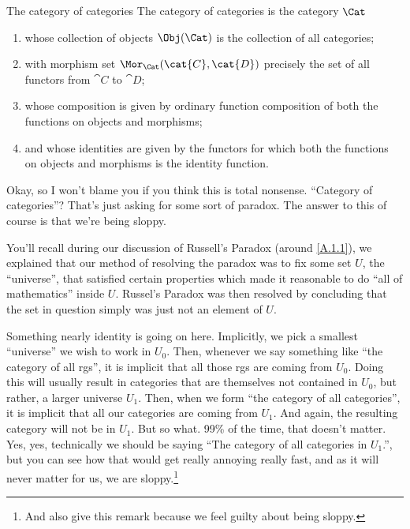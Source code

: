 \begin{exm}{The category of categories}{}
	The category of categories is the category $\Cat$
	\begin{enumerate}
		\item whose collection of objects $\Obj (\Cat )$ is the collection of all categories;
		\item with morphism set $\Mor _{\Cat}(\cat{C},\cat{D})$ precisely the set of all functors from $\cat{C}$ to $\cat{D}$;
		\item whose composition is given by ordinary function composition of both the functions on objects and morphisms;
		\item and whose identities are given by the functors for which both the functions on objects and morphisms is the identity function.
	\end{enumerate}
	\begin{rmk}
		Okay, so I won't blame you if you think this is total nonsense.  ``Category of categories''?  That's just asking for some sort of paradox.  The answer to this of course is that we're being sloppy.
		
		You'll recall during our discussion of Russell's Paradox (around \eqref{A.1.1}), we explained that our method of resolving the paradox was to fix some set $U$, the ``universe'', that satisfied certain properties which made it reasonable to do ``all of mathematics'' inside $U$.  Russel's Paradox was then resolved by concluding that the set in question simply was just not an element of $U$.
		
		Something nearly identity is going on here.  Implicitly, we pick a smallest ``universe'' we wish to work in $U_0$.  Then, whenever we say something like ``the category of all rgs'', it is implicit that all those rgs are coming from $U_0$.  Doing this will usually result in categories that are themselves not contained in $U_0$, but rather, a larger universe $U_1$.  Then, when we form ``the category of all categories'', it is implicit that all our categories are coming from $U_1$.  And again, the resulting category will not be in $U_1$.  But so what.  99\% of the time, that doesn't matter.  Yes, yes, technically we should be saying ``The category of all categories in $U_1$.'', but you can see how that would get really annoying really fast, and as it will never matter for us, we are sloppy.\footnote{And also give this remark because we feel guilty about being sloppy.}
	\end{rmk}
\end{exm}

